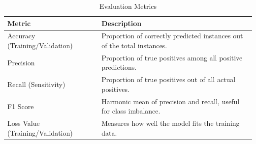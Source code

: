 \documentclass[conference]{IEEEtran}
\begin{document}
\begin{table}[h]
    \centering
    \caption{Evaluation Metrics}
    \label{tab:metrics}
    \begin{tabularx}{\textwidth}{@{}lX@{}}
        \toprule
        \textbf{Metric} & \textbf{Description} \\ 
        \midrule
        Accuracy (Training/Validation)          & Proportion of correctly predicted instances out of the total instances. \\ 
        Precision          & Proportion of true positives among all positive predictions. \\ 
        Recall (Sensitivity) & Proportion of true positives out of all actual positives. \\ 
        F1 Score          & Harmonic mean of precision and recall, useful for class imbalance. \\ 
        Loss Value (Training/Validation)       & Measures how well the model fits the training data. \\ 
        \bottomrule
    \end{tabularx}
\end{table}
\end{document}
